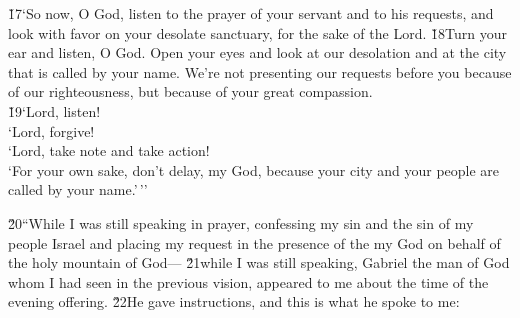 \begin{poetry}
\poeml \v{17}`So now, O God, listen to the prayer of your servant and to his requests, and look with favor on your desolate sanctuary, for the sake of the Lord. \v{18}Turn your ear and listen, O God. Open your eyes and look at our desolation and at the city that is called by your name. We're not presenting our requests before you because of our righteousness, but because of your great compassion. \\
\poeml \v{19}`Lord, listen! \\
\poeml `Lord, forgive! \\
\poeml `Lord, take note and take action! \\
\poeml `For your own sake, don't delay, my God, because your city and your people are called by your name.'\,''
\end{poetry}

\v{20}``While I was still speaking in prayer, confessing my sin and the sin of my people Israel and placing my request in the presence of the  my God on behalf of the holy mountain of God--- \v{21}while I was still speaking, Gabriel the man of God whom I had seen in the previous vision, appeared to me about the time of the evening offering. \v{22}He gave instructions, and this is what he spoke to me:


